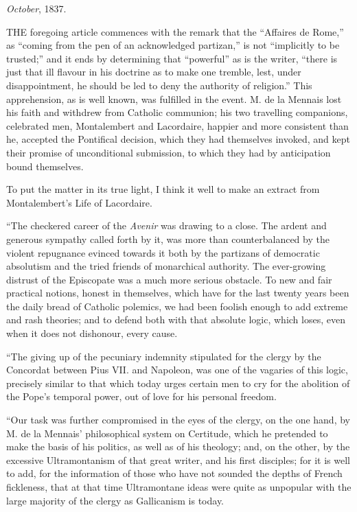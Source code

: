 \emph{October}, 1837.


THE
foregoing article commences with the remark that the ``Affaires de
Rome,'' as ``coming from the pen of an acknowledged partizan,'' is not ``implicitly
to be trusted;'' and it ends by determining that ``powerful'' as is the
writer, ``there is just that ill flavour in his doctrine as to make one
tremble, lest, under disappointment, he should be led to deny the
authority of religion.'' This apprehension, as is well known, was
fulfilled in the event. M. de la Mennais lost his faith and withdrew
from Catholic communion; his two travelling companions, celebrated
men, Montalembert and Lacordaire, happier and more consistent than he,
accepted the Pontifical decision, which they had themselves invoked,
and kept their promise of unconditional submission, to which they had
by anticipation bound themselves.

To put the matter in its true light, I think it
well to make an extract from Montalembert's Life of Lacordaire.

``The checkered career of the \emph{Avenir}
was drawing to a close. The ardent and generous sympathy called forth
by it, was more than counterbalanced by the violent repugnance evinced
towards it both by the partizans of democratic absolutism and the
tried friends of monarchical authority. The ever-growing distrust of
the Episcopate was a much more serious obstacle. To new and fair
practical notions, honest in themselves, which have for the last
twenty years been the daily bread of Catholic polemics, we had
been foolish enough to add extreme and rash theories; and to defend
both with that absolute logic, which loses, even when it does not
dishonour, every cause.

``The giving up of the pecuniary indemnity
stipulated for the clergy by the Concordat between Pius VII. and
Napoleon, was one of the vagaries of this logic, precisely similar to
that which today urges certain men to cry for the abolition of the
Pope's temporal power, out of love for his personal freedom.

``Our task was further compromised in the eyes of
the clergy, on the one hand, by M. de la Mennais' philosophical system
on Certitude, which he pretended to make the basis of his politics, as
well as of his theology; and, on the other, by the excessive
Ultramontanism of that great writer, and his first disciples; for it
is well to add, for the information of those who have not sounded the
depths of French fickleness, that at that time Ultramontane ideas were
quite as unpopular with the large majority of the clergy as
Gallicanism is today.

